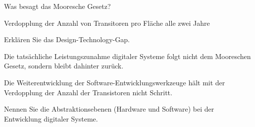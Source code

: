 \documentclass
[
  draft    = true,
  fontsize = 11pt,
  parskip  = half-,
  BCOR     = 0pt,
  DIV      = 11,
  ngerman,
  dvipsnames
]
{scrartcl}
\begin{document}
\begin{mytemize}
  \item Was besagt das Mooresche Gesetz? 
        \begin{achim}
          \begin{mytemize}
            \item Verdopplung der Anzahl von Transitoren pro Fläche alle zwei Jahre
          \end{mytemize}
        \end{achim}
  \item Erklären Sie das \glqq{}Design-Technology-Gap\grqq. 
        \begin{achim}
          \begin{mytemize}
            \item Die tatsächliche Leistungszunahme digitaler Systeme folgt nicht dem Mooreschen Gesetz,
                  sondern bleibt dahinter zurück.
            \item Die Weiterentwicklung der Software-Entwicklungswerkzeuge hält mit der
                  Verdopplung der Anzahl der Transistoren nicht Schritt.
          \end{mytemize}
        \end{achim}
  \item Nennen Sie die Abstraktionsebenen (Hardware und Software) bei der Entwicklung digitaler Systeme. 
        \begin{achim}
          \begin{center}
\end{center}
\end{achim}
\end{mytemize}
\end{document}
